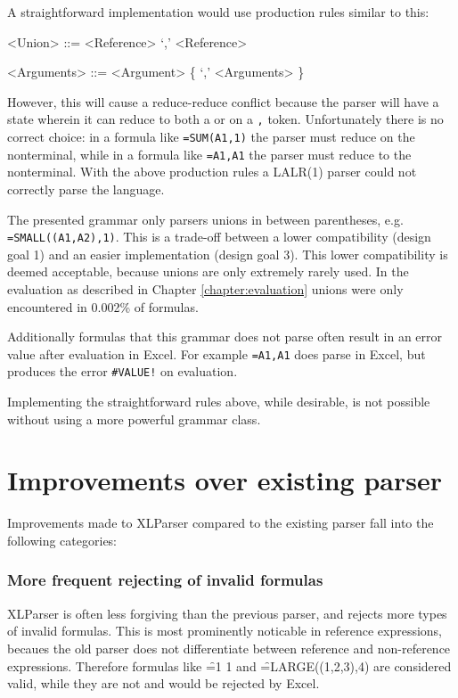 \noindent A straightforward implementation would use production rules similar to this:
\begin{grammar}
<Union> ::= <Reference> `,' <Reference>

<Arguments> ::= <Argument> \{ `,' <Arguments> \}
\end{grammar}

However, this will cause a reduce-reduce conflict because the parser will have a state wherein it can reduce to both a  or  on a \texttt{,} token.
Unfortunately there is no correct choice: in a formula like \texttt{=SUM(A1,1)} the parser must reduce on the  nonterminal, while in a formula like \texttt{=A1,A1} the parser must reduce to the  nonterminal.
With the above production rules a LALR(1) parser could not correctly parse the language.

The presented grammar only parsers unions in between parentheses, e.g. \texttt{=SMALL((A1,A2),1)}.
This is a trade-off between a lower compatibility (design goal 1) and an easier implementation (design goal 3).
This lower compatibility is deemed acceptable, because unions are only extremely rarely used.
In the evaluation as described in Chapter \ref{chapter:evaluation} unions were only encountered in 0.002\% of formulas.

Additionally formulas that this grammar does not parse often result in an error value after evaluation in Excel.
For example \texttt{=A1,A1} does parse in Excel, but produces the error \texttt{\#VALUE!} on evaluation.

Implementing the straightforward rules above, while desirable, is not possible without using a more powerful grammar class.

\newpage

\section{Improvements over existing parser}

Improvements made to XLParser compared to the existing parser fall into the following categories:

\subsubsection{More frequent rejecting of invalid formulas}

XLParser is often less forgiving than the previous parser, and rejects more types of invalid formulas.
This is most prominently noticable in reference expressions, becaues the old parser does not differentiate between reference and non-reference expressions.
Therefore formulas like \f{=1 1} and \f{=LARGE((1,2,3),4)} are considered valid, while they are not and would be rejected by Excel.


